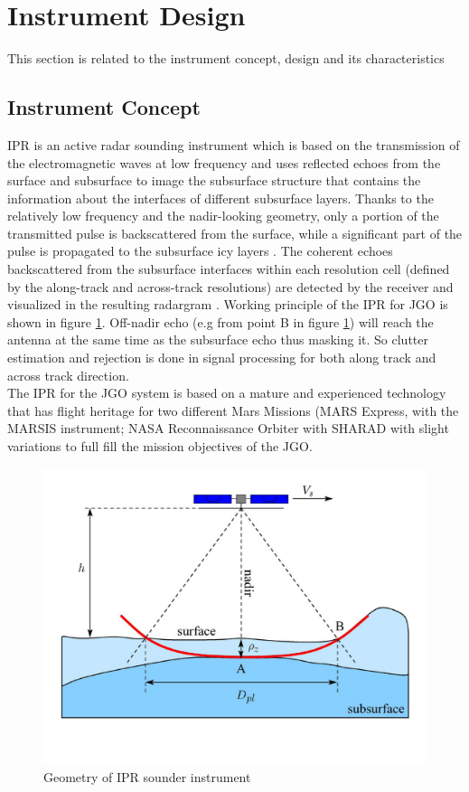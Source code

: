 \section{Instrument Design}
\label{IPR_design}
This section is related to the instrument concept, design and its characteristics 
\subsection{Instrument Concept}
\ac{IPR} is an active radar sounding instrument which is based on the transmission of the electromagnetic waves at low frequency and uses reflected echoes from the surface and subsurface to image the subsurface structure that contains the information about the interfaces of different subsurface layers. Thanks to the relatively low frequency and the nadir-looking geometry, only a portion of the transmitted pulse is backscattered from the surface, while a significant part of the pulse is propagated to the subsurface icy layers \cite{Gany_SRS}. The coherent echoes backscattered from the subsurface interfaces within each resolution cell (defined by the along-track and across-track resolutions) are detected by the receiver and visualized in the resulting radargram \cite{Gany_SRS}. Working principle of the \ac{IPR} for \ac{JGO} is shown in figure \ref{fig:IPR_concept}. Off-nadir echo (e.g from point B in figure \ref{fig:IPR_concept}) will reach the antenna at the same time as the subsurface echo thus masking it. So clutter estimation and rejection is done in signal processing for both along track and across track direction.\\
%
The \ac{IPR} for the \ac{JGO} system is based on a mature and experienced technology that has flight heritage for two different Mars Missions (MARS Express, with the \ac{MARSIS} instrument; NASA Reconnaissance Orbiter with \ac{SHARAD} with slight variations to full fill  the mission objectives of the \ac{JGO}.
%
\begin{figure}[bht]
\centering
\includegraphics[scale=0.5]{Figures/IPR_Concept.pdf}
\caption{Geometry of \ac{IPR} sounder instrument \cite{Gany_SRS}} 
\label{fig:IPR_concept}
\end{figure}
%
